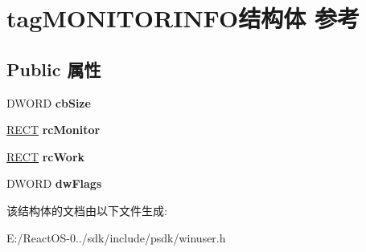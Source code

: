 \hypertarget{structtag_m_o_n_i_t_o_r_i_n_f_o}{}\section{tag\+M\+O\+N\+I\+T\+O\+R\+I\+N\+F\+O结构体 参考}
\label{structtag_m_o_n_i_t_o_r_i_n_f_o}
\subsection*{Public 属性}
\begin{DoxyCompactItemize}
\item 
\mbox{\label{structtag_m_o_n_i_t_o_r_i_n_f_o_ae33bcbe159b7f7f4917c0949287acaba}} 
D\+W\+O\+RD {\bfseries cb\+Size}
\item 
\mbox{\label{structtag_m_o_n_i_t_o_r_i_n_f_o_a3e7136198a3c55f18014f6b8cc78e37c}} 
\hyperlink{structtag_r_e_c_t}{R\+E\+CT} {\bfseries rc\+Monitor}
\item 
\mbox{\label{structtag_m_o_n_i_t_o_r_i_n_f_o_a6b69929d40dcc1715001f2f3140130a5}} 
\hyperlink{structtag_r_e_c_t}{R\+E\+CT} {\bfseries rc\+Work}
\item 
\mbox{\label{structtag_m_o_n_i_t_o_r_i_n_f_o_a7f7a1608179d7bf5b75abc2152fe04de}} 
D\+W\+O\+RD {\bfseries dw\+Flags}
\end{DoxyCompactItemize}


该结构体的文档由以下文件生成\+:\begin{DoxyCompactItemize}
\item 
E\+:/\+React\+O\+S-\/0../sdk/include/psdk/winuser.\+h\end{DoxyCompactItemize}
